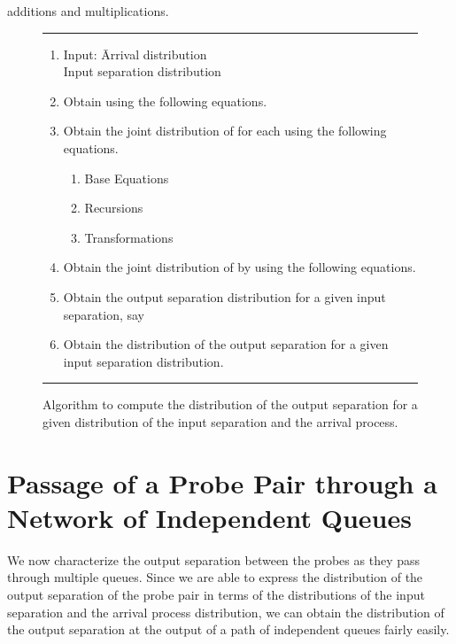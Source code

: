 \documentclass[11pt]{article}
\begin{document}
additions and multiplications. 

\small{
\begin{figure}
\rule{6.3in}{2mm}
    {\small{
        \begin{enumerate}
        \item 
          \begin{tabbing}
            Input: \=Arrival distribution \\
            \>Input separation distribution \\ 
          \end{tabbing}


        \item Obtain  using the following equations.
          

        \item Obtain the joint distribution of  for each  using the following equations.
          \begin{enumerate}
          \item Base Equations 
            

          \item Recursions
            
              
          \item Transformations
            
          \end{enumerate}
        
        \item Obtain the joint distribution of  by using the following equations.
          

        \item Obtain the output separation distribution for a given
          input separation,  say 
          

        \item Obtain the distribution of the output separation for a
          given input separation distribution.
          
        \end{enumerate}
      }
    }
  \rule{6.3in}{2mm}
  
  \caption{Algorithm to compute the distribution of the output
    separation for a given distribution of the input separation and
    the arrival process.}
  \label{alg:boxed-algorithm}
\end{figure}
}

\section{Passage of a Probe Pair through a Network of Independent
  Queues}
\label{sec:probe-pair-network}
We now characterize the output separation between the probes as they
pass through multiple queues.  Since we are able to express the
distribution of the output separation of the probe pair in terms of
the distributions of the input separation and the arrival process
distribution, we can obtain the distribution of the output separation
at the output of a path of independent queues fairly easily.
\end{document}
